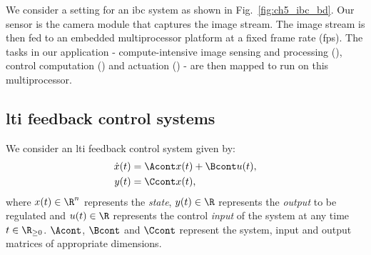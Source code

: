 We consider a setting for an \gls{ibc} system as shown in Fig.~\ref{fig:ch5_ibc_bd}. Our sensor is the camera module that captures the image stream. The image stream is then fed to an embedded multiprocessor platform at a fixed frame rate (\gls{fps}). The tasks in our application - compute-intensive image sensing and processing (\taskS), control computation (\taskC) and actuation (\taskA) - are then mapped to run on this multiprocessor. 

\subsection{\Gls{lti} feedback control systems}
We consider an \gls{lti} feedback control system given by:
\begin{align}
\label{eq:ch5_ch5_contsys}
\dot{x}(t) &= \Acont x(t) +  \Bcont u(t), 
\\
y(t) &= \Ccont x(t),\nonumber
\end{align}
where $x(t) \in \R^n$ represents the \textit{state}, $y(t)\in\R$ represents the \textit{output} to be regulated and $u(t) \in \R$ represents the control \textit{input} of the system at any time
$t \in \R_{\geq 0}$.
$\Acont$, $\Bcont$ and $\Ccont$ represent the system, input and output matrices of appropriate dimensions.

